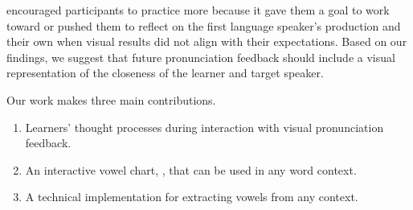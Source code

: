 \visowel{} encouraged participants to practice more because it gave them a goal to work toward or pushed them to reflect on the first language speaker's production and their own when visual results did not align with their expectations. Based on our findings, we suggest that future pronunciation feedback should include a visual representation of the closeness of the learner and target speaker.

Our work makes three main contributions.
\begin{enumerate}
    \item Learners' thought processes during interaction with visual pronunciation feedback.
    \item An interactive vowel chart, \visowel{}, that can be used in any word context.
    \item A technical implementation for extracting vowels from any context.
\end{enumerate}


